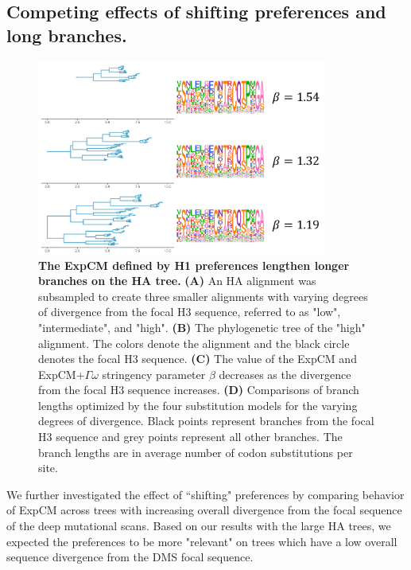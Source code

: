 \documentclass[11pt]{article}
\begin{document}
\subsection*{Competing effects of shifting preferences and long branches.}

\begin{figure}[H]
\centerline{\includegraphics[width=0.85\textwidth]{figures/doud_compete_2}}
\caption{\label{fig:doud_compete}
\textbf{The ExpCM defined by H1 preferences lengthen longer branches on the HA tree.} 
\textbf{(A)} An HA alignment was subsampled to create three smaller alignments with varying degrees of divergence from the focal H3 sequence, referred to as "low", "intermediate", and "high". 
\textbf{(B)} The phylogenetic tree of the "high" alignment. 
The colors denote the alignment and the black circle denotes the focal H3 sequence. 
\textbf{(C)} The value of the ExpCM and ExpCM+$\Gamma\omega$ stringency parameter $\beta$ decreases as the divergence from the focal H3 sequence increases. 
\textbf{(D)} Comparisons of branch lengths optimized by the four substitution models for the varying degrees of divergence. 
Black points represent branches from the focal H3 sequence and grey points represent all other branches.  
The branch lengths are in average number of codon substitutions per site. 
}
\end{figure}

We further investigated the effect of ``shifting" preferences by comparing behavior of ExpCM across trees with increasing overall divergence from the focal sequence of the deep mutational scans. 
Based on our results with the large HA trees, we expected the preferences to be more "relevant" on trees which have a low overall sequence divergence from the DMS focal sequence. 
\end{document}
